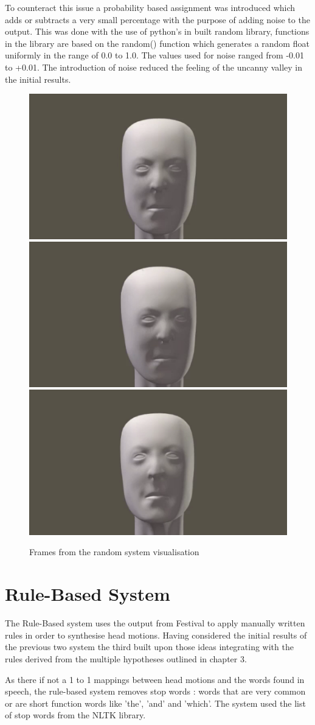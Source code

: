 \documentclass[bsc,frontabs,twoside,singlespacing,parskip,deptreport]{infthesis}
\begin{document}
To counteract this issue a probability based assignment was introduced which adds or subtracts a very small percentage with the purpose of adding noise to the output. This was done with the use of python's in built random library, functions in the library are based on the random() function which generates a random float uniformly in the range of 0.0 to 1.0. The values used for noise ranged from -0.01 to +0.01. The introduction of noise reduced the feeling of the uncanny valley in the initial results.

\begin{figure}
	\centering
	\includegraphics[width=.3\textwidth]{fightclub1.png}
	\includegraphics[width=.3\textwidth]{fightclub3.png}
	\includegraphics[width=.3\textwidth]{fightclub4.png}
	\caption{Frames from the random system visualisation}
\end{figure}

\section{Rule-Based System}

The Rule-Based system uses the output from Festival to apply manually written rules in order to synthesise head motions. Having considered the initial results of the previous two system the third built upon those ideas integrating with the rules derived from the multiple hypotheses outlined in chapter 3.

As there if not a 1 to 1 mappings between head motions and the words found in speech, the rule-based system removes stop words : words that are very common or are short function words like 'the', 'and' and 'which'. The system used the list of stop words from the NLTK library.
\end{document}
